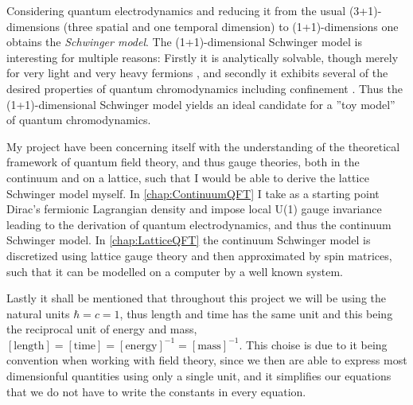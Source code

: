 \documentclass[../main.tex]{subfiles} %
\begin{document}
Considering quantum electrodynamics and reducing it from the usual (3+1)-dimensions (three spatial and one temporal dimension) to (1+1)-dimensions one obtains the \emph{Schwinger model}. The (1+1)-dimensional Schwinger model is interesting for multiple reasons: Firstly it is analytically solvable, though merely for very light and very heavy fermions \cite{crewther_eigenvalueForSchwingerModel_1980}, and secondly it exhibits several of the desired properties of quantum chromodynamics including confinement \cite{hamer_massiveSchwingerModelOnLattice_1982}. Thus the (1+1)-dimensional Schwinger model yields an ideal candidate for a ''toy model'' of quantum chromodynamics.

My project have been concerning itself with the understanding of the theoretical framework of quantum field theory, and thus gauge theories, both in the continuum and on a lattice, such that I would be able to derive the lattice Schwinger model myself. In \cref{chap:ContinuumQFT} I take as a starting point Dirac's fermionic Lagrangian density and impose local U(1) gauge invariance leading to the derivation of quantum electrodynamics, and thus the continuum Schwinger model. In \cref{chap:LatticeQFT} the continuum Schwinger model is discretized using lattice gauge theory and then approximated by spin matrices, such that it can be modelled on a computer by a well known system. %

Lastly it shall be mentioned that throughout this project we will be using the natural units $\hbar = c = 1$, thus length and time has the same unit and this being the reciprocal unit of energy and mass, $[\mathrm{length}] = [\mathrm{time}] = [\mathrm{energy}]^{-1} = [\mathrm{mass}]^{-1}$. This choise is due to it being convention when working with field theory, since we then are able to express most dimensionful quantities using only a single unit, and it simplifies our equations that we do not have to write the constants in every equation.
\end{document}
